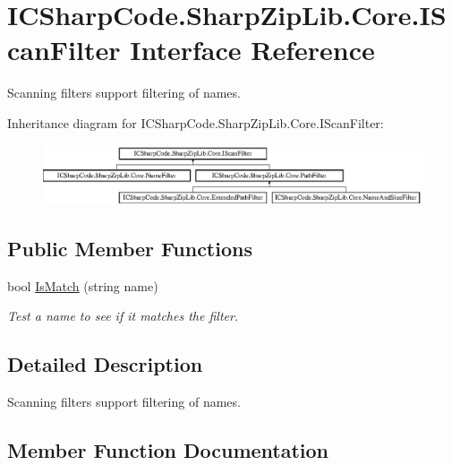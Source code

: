 \hypertarget{interface_i_c_sharp_code_1_1_sharp_zip_lib_1_1_core_1_1_i_scan_filter}{}\section{I\+C\+Sharp\+Code.\+Sharp\+Zip\+Lib.\+Core.\+I\+Scan\+Filter Interface Reference}
\label{interface_i_c_sharp_code_1_1_sharp_zip_lib_1_1_core_1_1_i_scan_filter}


Scanning filters support filtering of names.  


Inheritance diagram for I\+C\+Sharp\+Code.\+Sharp\+Zip\+Lib.\+Core.\+I\+Scan\+Filter\+:\begin{figure}[H]
\begin{center}
\leavevmode
\includegraphics[height=1.783440cm]{interface_i_c_sharp_code_1_1_sharp_zip_lib_1_1_core_1_1_i_scan_filter}
\end{center}
\end{figure}
\subsection*{Public Member Functions}
\begin{DoxyCompactItemize}
\item 
bool \hyperlink{interface_i_c_sharp_code_1_1_sharp_zip_lib_1_1_core_1_1_i_scan_filter_aea9e60fe7abb0e8c969d884b96b84096}{Is\+Match} (string name)
\begin{DoxyCompactList}\small\item\em Test a name to see if it \textquotesingle{}matches\textquotesingle{} the filter. \end{DoxyCompactList}\end{DoxyCompactItemize}


\subsection{Detailed Description}
Scanning filters support filtering of names. 



\subsection{Member Function Documentation}
\mbox{\label{interface_i_c_sharp_code_1_1_sharp_zip_lib_1_1_core_1_1_i_scan_filter_aea9e60fe7abb0e8c969d884b96b84096}} 
